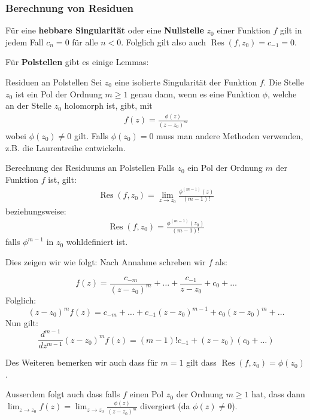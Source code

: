 \documentclass[a4paper,10pt]{article}
\DeclareMathOperator{\Res}{Res}
\begin{document}
\subsubsection{Berechnung von Residuen}

Für eine \textbf{hebbare Singularität} oder eine \textbf{Nullstelle} $z_0$ einer Funktion $f$ gilt in jedem Fall $c_n = 0$ für alle $n < 0$. Folglich gilt also auch $\Res(f, z_0) = c_{-1} = 0$.

Für \textbf{Polstellen} gibt es einige Lemmas:

\begin{subbox}{Residuen an Polstellen}
  Sei \(z_0\) eine isolierte Singularität der Funktion \(f\). Die Stelle \(z_0\) ist ein Pol der Ordnung \(m\geq1\) genau dann, wenn es eine Funktion $\phi$, welche an der Stelle \(z_0\) holomorph ist, gibt, mit \begin{align*} f(z)=\frac{\phi(z)}{(z-z_0)^m} \end{align*} wobei \(\phi(z_0)\neq0\) gilt. Falls $\phi(z_0) = 0$ muss man andere Methoden verwenden, z.B. die Laurentreihe entwickeln.
\end{subbox}

\begin{mainbox}{Berechnung des Residuums an Polstellen}
  Falls \(z_0\) ein Pol der Ordnung \(m\) der Funktion \(f\) ist, gilt: \begin{align*} 
     \operatorname{Res}(f,z_0)= \lim_{z \to z_0} \frac{\phi^{(m-1)}(z)}{(m-1)!} 
  \end{align*}
  beziehungsweise:
  \begin{align*} 
    \operatorname{Res}(f,z_0)= \frac{\phi^{(m-1)}(z_0)}{(m-1)!} 
 \end{align*}
 falls $\phi^{m-1}$ in $z_0$ wohldefiniert ist.
\end{mainbox}

Dies zeigen wir wie folgt: Nach Annahme schreben wir $f$ als:

$$
  f(z) = \frac{c_{-m}}{(z - z_0)^m} + \ldots + \frac{c_{-1}}{z - z_0} + c_0 + \ldots
$$
Folglich:
$$
  (z - z_0)^m f(z) = c_{-m} + \ldots + c_{-1} (z - z_0)^{m-1} + c_0 (z - z_0)^m + \ldots
$$
Nun gilt:
$$
\frac{d^{m-1}}{dz^{m-1}} (z - z_0)^m f(z) = (m - 1)! c_{-1} + (z - z_0) (c_0 + \ldots)
$$

Des Weiteren bemerken wir auch dass für $m = 1$ gilt dass $\Res(f, z_0) = \phi(z_0)$.

Ausserdem folgt auch dass falls $f$ einen Pol $z_0$ der Ordnung $m \geq 1$ hat, dass dann $\lim_{z \to z_0} f(z) = \lim_{z \to z_0} \frac{\phi(z)}{(z - z_0)^m}$ divergiert (da $\phi(z) \neq 0$).
\end{document}
